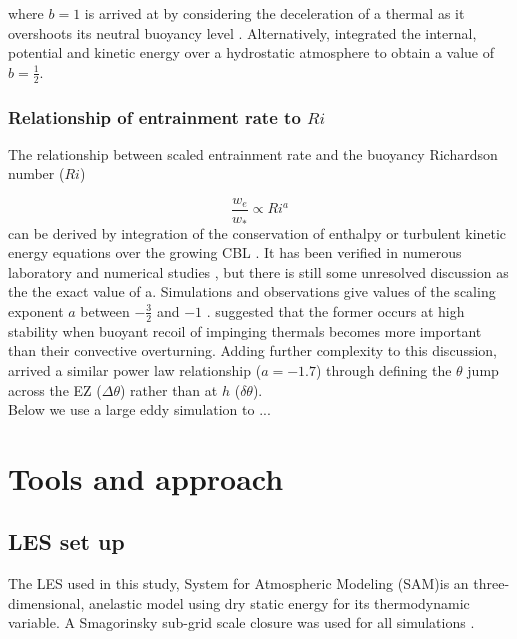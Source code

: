 \documentclass[referee]{svjour3}
\begin{document}
where $b=1$ is arrived at by considering the deceleration of a thermal
as it overshoots its neutral buoyancy level \cite{StullNelEl}.  Alternatively, \cite{Boers89} integrated the internal, potential and kinetic energy over a hydrostatic atmosphere to obtain a value of $b=\frac{1}{2}$.

\subsubsection{Relationship of entrainment rate to $Ri$}
\label{subsec:erri}
The relationship between scaled entrainment rate and the buoyancy Richardson number ($Ri$)

\begin{equation}\label{eq:ervsri}
\frac{w_{e}}{w_{*}} \propto Ri^{a}
\end{equation}
can be derived by integration of the conservation of enthalpy or turbulent kinetic energy equations over the growing CBL \citep{Tennekes73, Deardorff79, FedConzMir04}. It has been verified in numerous laboratory and numerical studies \citep{DearWill80, SullMoengStev, FedConzMir04, BrooksFowler2}, but there is still some unresolved discussion as the the exact value of a.  Simulations and observations give  values of the scaling exponent $a$ between $-\frac{3}{2}$ and $-1$ \citep{Traum11}.  \cite{Turner86} suggested that the former occurs at high stability when buoyant recoil of impinging thermals becomes more important than their convective overturning.  Adding further complexity to this discussion, \cite{FedConzMir04} arrived a similar power law relationship ($a = -1.7$) through defining the $\theta$ jump across the EZ ($\Delta \theta$) rather than at $h$ ($\delta \theta$).\\

Below we use a large eddy simulation to ...

\section{Tools and approach}

\subsection{LES set up}

The LES used in this study, System for Atmospheric Modeling (SAM)is an three-dimensional, anelastic model using dry static energy for its thermodynamic variable.  A Smagorinsky sub-grid scale closure was used for all simulations \citep{KhairRand}.
\end{document}
